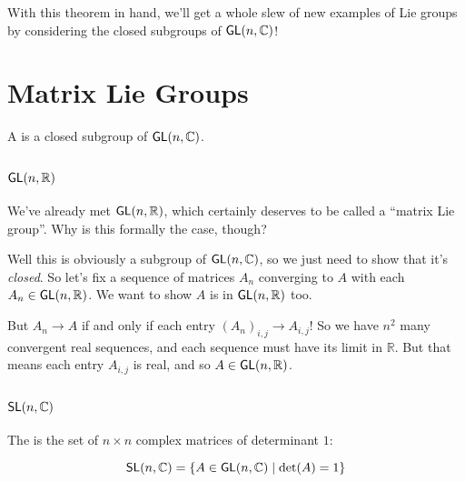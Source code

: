 \documentclass[../main.tex]{subfiles}
\begin{document}
With this theorem in hand, we'll get a whole slew of new examples of Lie groups
by considering the closed subgroups of $\mathsf{GL}(n,\mathbb{C})$!


\section{Matrix Lie Groups}


\begin{defn}
A  is a closed subgroup of $\mathsf{GL}(n,\mathbb{C})$. 
\end{defn}


\subsection{$\mathsf{GL}(n,\mathbb{R})$}

We've already met $\mathsf{GL}(n,\mathbb{R})$, which certainly deserves to be called 
a ``matrix Lie group''. Why is this formally the case, though?

Well this is obviously a subgroup of $\mathsf{GL}(n,\mathbb{C})$, so we just need to 
show that it's \emph{closed}. So let's fix a sequence of matrices 
$A_n$ converging to $A$ with each $A_n \in \mathsf{GL}(n,\mathbb{R})$. We want to
show $A$ is in $\mathsf{GL}(n,\mathbb{R})$ too.

But $A_n \to A$ if and only if each entry $(A_n)_{i,j} \to A_{i,j}$! 
So we have $n^2$ many convergent real sequences, and each sequence must
have its limit in $\mathbb{R}$. But that means each entry $A_{i,j}$ is 
real, and so $A \in \mathsf{GL}(n,\mathbb{R})$.

\subsection{$\mathsf{SL}(n,\mathbb{C})$}

\begin{defn}
  The  is the set of $n \times n$ complex
  matrices of determinant $1$:

  \[
    \mathsf{SL}(n,\mathbb{C}) = \{ A \in \mathsf{GL}(n,\mathbb{C}) \mid \text{det}(A) = 1 \}
  \]
\end{defn}
\end{document}
